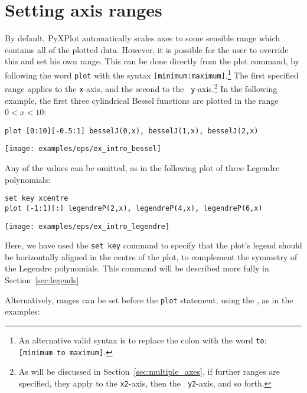 
\section{Setting axis ranges}
\label{sec:plot_ranges}

By default, PyXPlot automatically scales axes to some sensible range which
contains all of the plotted data. However, it is possible for the user to
override this and set his own range. This can be
done directly from the plot command, by following the word {\tt plot} with the
syntax {\tt [minimum:maximum]}.\footnote{An alternative valid syntax is to
replace the colon with the word {\tt to}: {\tt [minimum to maximum]}.} The
first specified range applies to the {\tt x}-axis, and the second to the {\tt
y}-axis.\footnote{As will be discussed in Section~\ref{sec:multiple_axes}, if
further ranges are specified, they apply to the {\tt x2}-axis, then the {\tt
y2}-axis, and so forth.} In the following example, the first three cylindrical
Bessel functions are plotted in the range $0<x<10$:

\begin{verbatim}
plot [0:10][-0.5:1] besselJ(0,x), besselJ(1,x), besselJ(2,x)
\end{verbatim}
\begin{center}
\texttt{[image: examples/eps/ex\_intro\_bessel]}
\end{center}

\noindent Any of the values can be omitted, as in the following plot of
three Legendre polynomials:

\begin{verbatim}
set key xcentre
plot [-1:1][:] legendreP(2,x), legendreP(4,x), legendreP(6,x)
\end{verbatim}
\begin{center}
\texttt{[image: examples/eps/ex\_intro\_legendre]}
\end{center}

\noindent Here, we have used the {\tt set key} command to specify that the
plot's legend should be horizontally aligned in the centre of the plot, to
complement the symmetry of the Legendre polynomials. This command will be
described more fully in Section~\ref{sec:legends}.

Alternatively, ranges can be set before the {\tt plot} statement, using the
, as in the examples:

